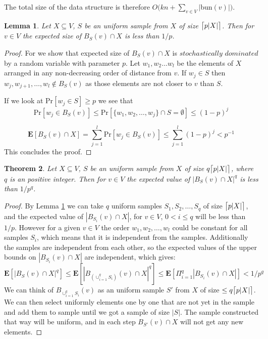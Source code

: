\documentclass[shortabstract, lic, english]{iithesis}
\theoremstyle{definition} \newtheorem{definition}{Definition}[chapter]
\theoremstyle{plain} \newtheorem{remark}[definition]{Observation}
\theoremstyle{plain} \newtheorem{theorem}[definition]{Theorem}
\theoremstyle{plain} \newtheorem{lemma}[definition]{Lemma}
\theoremstyle{plain} \newtheorem{conjecture}[definition]{Conjecture}
\DeclarePairedDelimiter{\ceil}{\lceil}{\rceil}
\begin{document}
The total size of the data structure is therefore $O(kn + \sum_{v \in V}|$bun$(v)|)$.

\begin{lemma} \label{ballSize}
    Let $X \subseteq V$, $S$ be an uniform sample from $X$ of size $\ceil[\big]{p|X|}$.
    Then for $v \in V$ the expected size of $B_{S}(v) \cap X$ is less than $1/p$.
\end{lemma}

\begin{proof}
    For we show that expected size of $B_{S}(v) \cap X$ is
    $stochastically$ $dominated$ by a random variable with parameter $p$.
    Let $w_1, w_2 \ldots w_l$ be the elements of $X$ arranged in any non-decreasing order of distance from $v$.
    If $w_j \in S$ then $w_j, w_{j+1}, \ldots , w_l \notin B_{S}(v)$
    as those elements are not closer to $v$ than $S$.

    If we look at Pr$[w_j \in S] \geq p$ we see that 
    $$\text{Pr}[w_j \in B_{S}(v)] \leq
    \text{Pr}[\{w_1, w_2, \ldots, w_j\} \cap S = \emptyset] \leq (1 - p)^j$$

    $$\mathbf{E}[B_{S}(v) \cap X] = \sum_{j=1}^{l} \text{Pr}[w_j \in B_{S}(v)] \leq \sum_{j=1}^{l}(1-p)^j < p^{-1}$$
    This concludes the proof.
\end{proof}

\begin{theorem} \label{ballSizeStrong}
    Let $X \subseteq V$, $S$ be an uniform sample from $X$ of size $q\ceil[\big]{p|X|}$, where $q$ is an positive integer.
    Then for $v \in V$ the expected value of $|B_{S}(v) \cap X|^q$ is less than $1/p^q$.
\end{theorem}

\begin{proof}
    By Lemma \ref{ballSize} we can take $q$ uniform samples $S_1, S_2, \ldots, S_q$ of size $\ceil[\big]{p |X|}$,
    and the expected value of $|B_{S_i}(v) \cap X|$, for $v \in V$, $0 < i \leq q$ will be less than $1/p$.
    However for a given $v \in V$ the order $w_1, w_2, \ldots, w_l$ could be constant for all samples $S_i$,
    which means that it is independent from the samples. Additionally the samples are independent from each other,
    so the expected values of the upper bounds on $|B_{S_i}(v) \cap X|$ are independent, which gives:
    $$\mathbf{E}[|B_{S}(v) \cap X|^q] \leq \mathbf{E}[|B_{(\cup_{i = 1}^{q} S_i)}(v) \cap X|^q] \leq \mathbf{E}[\Pi_{i = 1}^{q} |B_{S_i}(v) \cap X|] < 1/p^q$$
    We can think of $B_{\cup_{i = 1}^{q} S_i}(v)$ as an uniform sample $S'$ from $X$ of size $\leq q\ceil[\big]{p|X|}$.
    We can then select uniformly elements one by one that are not yet in the sample and add them to sample until we got a sample of size $|S|$.
    The sample constructed that way will be uniform, and in each step $B_{S'}(v) \cap X$ will not get any new elements.
\end{proof}
\end{document}
